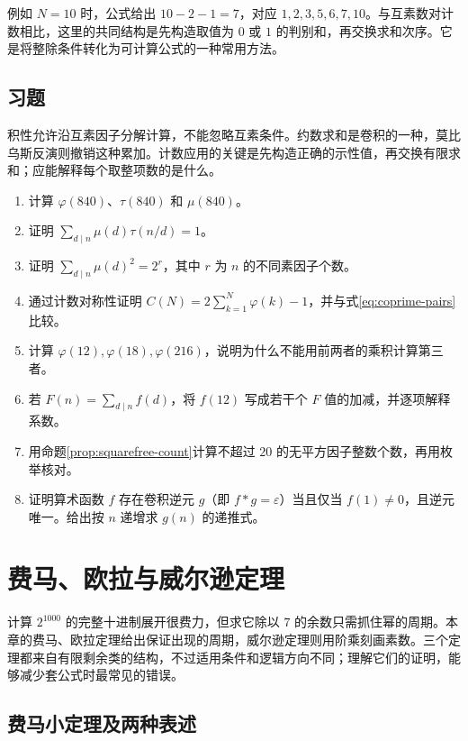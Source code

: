 \documentclass[UTF8,12pt,a4paper,fontset=fandol]{ctexbook}
\begin{document}
例如 $N=10$ 时，公式给出 $10-2-1=7$，对应 $1,2,3,5,6,7,10$。与互素数对计数相比，这里的共同结构是先构造取值为 $0$ 或 $1$ 的判别和，再交换求和次序。它是将整除条件转化为可计算公式的一种常用方法。

\section{习题}

积性允许沿互素因子分解计算，不能忽略互素条件。约数求和是卷积的一种，莫比乌斯反演则撤销这种累加。计数应用的关键是先构造正确的示性值，再交换有限求和；应能解释每个取整项数的是什么。

\begin{enumerate}
 \item 计算 $\varphi(840)$、$\tau(840)$ 和 $\mu(840)$。
 \item 证明 $\sum_{d\mid n}\mu(d)\tau(n/d)=1$。
 \item 证明 $\sum_{d\mid n}\mu(d)^2=2^r$，其中 $r$ 为 $n$ 的不同素因子个数。
 \item 通过计数对称性证明 $C(N)=2\sum_{k=1}^N\varphi(k)-1$，并与式\eqref{eq:coprime-pairs}比较。
 \item\label{ex:arith-noncoprime} 计算 $\varphi(12),\varphi(18),\varphi(216)$，说明为什么不能用前两者的乘积计算第三者。
 \item\label{ex:arith-invert-twelve} 若 $F(n)=\sum_{d\mid n}f(d)$，将 $f(12)$ 写成若干个 $F$ 值的加减，并逐项解释系数。
 \item\label{ex:arith-squarefree} 用命题\ref{prop:squarefree-count}计算不超过 $20$ 的无平方因子整数个数，再用枚举核对。
 \item\label{ex:arith-inverse} 证明算术函数 $f$ 存在卷积逆元 $g$（即 $f*g=\varepsilon$）当且仅当 $f(1)\ne0$，且逆元唯一。给出按 $n$ 递增求 $g(n)$ 的递推式。
\end{enumerate}

\chapter{费马、欧拉与威尔逊定理}
\label{ch:classical-congruences}

计算 $2^{1000}$ 的完整十进制展开很费力，但求它除以 $7$ 的余数只需抓住幂的周期。本章的费马、欧拉定理给出保证出现的周期，威尔逊定理则用阶乘刻画素数。三个定理都来自有限剩余类的结构，不过适用条件和逻辑方向不同；理解它们的证明，能够减少套公式时最常见的错误。

\section{费马小定理及两种表述}
\end{document}

